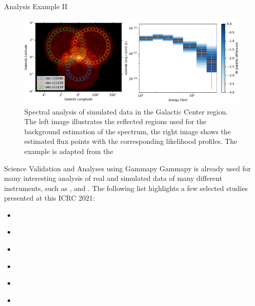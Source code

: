 \documentclass[
    final,
    ]{beamer}
\newlength{\colwidth}
\newcommand{\coloredhref}[3][blue]{\href{#2}{\color{#1}{#3}}}%
\begin{document}
\begin{frame}[t, fragile]
\begin{columns}[t]
\begin{column}{\colwidth}
\begin{block}{Analysis Example II}
    \begin{figure}
      \centering
      \includegraphics[width=\textwidth]{figures/cta-gc-image-spectrum.pdf}
      \caption{Spectral analysis of simulated \coloredhref[pink]{https://www.cta-observatory.org}{CTA} data in the Galactic Center region. The left image illustrates the reflected regions used for the  background estimation of the spectrum, the right image shows the estimated flux points with the
      corresponding likelihood profiles. The example is adapted from the \coloredhref[pink]{https://docs.gammapy.org/0.18.2/tutorials/cta_data_analysis.html}{cta data analysis tutorial} }
    \end{figure}
  \end{block}

  \begin{block}{Science Validation and Analyses using Gammapy}
  Gammapy is already used for many interesting analysis of real and simulated data of many different instruments, such as \coloredhref[pink]{https://www.mpi-hd.mpg.de/hfm/HESS/}{HESS}, \coloredhref[pink]{https://www.hawc-observatory.org}{HAWC} and \coloredhref[pink]{https://www.cta-observatory.org}{CTA}. The following list highlights a few selected studies presented at this ICRC 2021:

  \begin{itemize}
    \item \coloredhref[pink]{https://indico.desy.de/event/27991/contributions/101917/}{Survey of the Galactic Plane with the Cherenkov Telescope Array}
    \item \coloredhref[pink]{https://indico.desy.de/event/27991/contributions/101916/}{Large-scale diffuse emission in the H.E.S.S. Galactic Plane Survey}
    \item \coloredhref[pink]{https://indico.desy.de/event/27991/contributions/101942/}{Discovery of 100 TeV gamma-rays from HESS J1702-420: a new PeVatron candidate}
    \item \coloredhref[pink]{https://indico.desy.de/event/27991/contributions/101938/}{Search for enhanced TeV gamma ray emission from Giant Molecular Clouds using H.E.S.S.}
    \item \coloredhref[pink]{https://indico.desy.de/event/27991/contributions/101937/}{The young massive stellar cluster Westerlund 1 in gamma rays as seen with H.E.S.S.}
    \item \coloredhref[pink]{https://indico.desy.de/event/27991/contributions/102013/}{Standardized formats for gamma-ray analysis applied to HAWC observatory data}
  \end{itemize}


\end{block}
\end{column}
\end{columns}
\end{frame}
\end{document}
